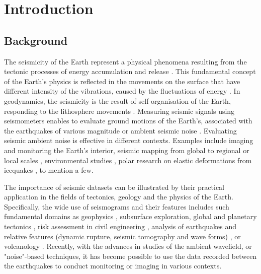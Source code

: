 \documentclass[informatics,article,submit,moreauthors,pdftex]{Definitions/mdpi}
\begin{document}

\section{Introduction}

\subsection{Background}
The seismicity of the Earth represent a physical phenomena resulting from the tectonic processes of energy accumulation and release \cite{GutenbergRichter}. This fundamental concept of the Earth's physics is reflected in the movements on the surface that have different intensity of the vibrations, caused by the fluctuations of energy \cite{Shearer2019}. In geodynamics, the seismicity is the result of self-organisation of the Earth, responding to the lithosphere movements \cite{UdiasBuforn2017}. Measuring seismic signals using seismometers enables to evaluate ground motions of the Earth’s, associated with the earthquakes of various magnitude or ambient seismic noise \cite{nakata_gualtieri_fichtner_2019}. Evaluating seismic ambient noise is effective in different contexts. Examples include imaging and monitoring the Earth’s interior, seismic mapping from global to regional or local scales \cite{Lecocq2014,Bezuidenhout}, environmental studies \cite{Roux}, polar research on elastic  deformations from icequakes \cite{Frankinet}, to mention a few.

The importance of seismic datasets can be illustrated by their practical application in the fields of tectonics, geology and the physics of the Earth. Specifically, the wide use of seismograms and their features \cite{Ammon2021} includes such fundamental domains as geophysics \cite{Kulhanek}, subsurface exploration, global and planetary tectonics \citep{Crampin,Jackson2002,Leroyetal2010}, risk assessment in civil engineering \citep{Phillips,Pileckietal2017, Kurzeja}, analysis of earthquakes and relative features (dynamic rupture, seismic tomography and wave forms) \cite{Ahorner,Steinmann,Amorese,Lomnitz,Yuliatmoko}, or volcanology \cite{Pezzo,DePlaenetal2018,DePlaenetal2018b}. Recently, with the advances in studies of the ambient wavefield, or "noise"-based techniques, it has become possible to use the data recorded between the earthquakes to conduct monitoring \cite{Lecocqetal2017,Ratdomopurbo,Mordret} or imaging \cite{brenguier2014mapping,Lemenkova202012,Braszusetal2021,Lemenkova202016,Lietal2000} in various contexts. 
\end{document}
